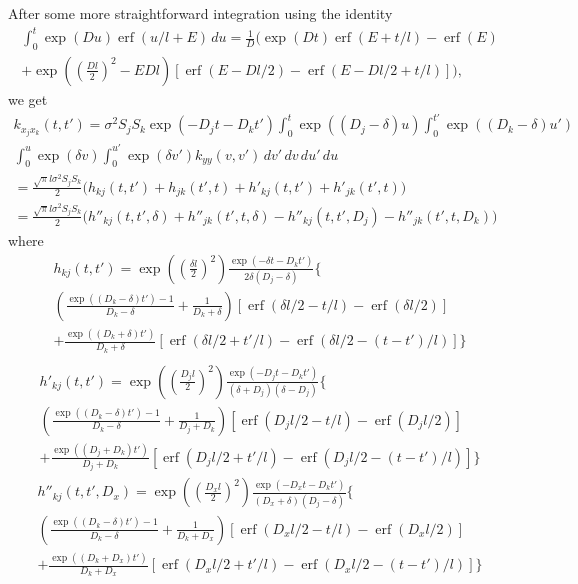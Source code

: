\documentclass{article}
\newcommand{\erf}{\operatorname{erf}}
\begin{document}
After some more straightforward integration using the identity
\begin{multline}
  \label{eq:gpsim_identity}
  \int_0^t \exp(D u) \erf(u/l + E)\,du =
  \frac{1}{D} \bigg(
  \exp(Dt) \erf(E + t/l) - \erf(E) \\
  + \exp\left(\left( \frac{Dl}{2}\right)^2 -E Dl \right)
  [ \erf(E - Dl/2) - \erf(E-Dl/2+t/l) ]
  \bigg),
\end{multline}
we get
\begin{multline}
  k_{x_j x_k}(t, t') = \sigma^2 S_j S_k \exp(-D_j t - D_k t')
  \int_0^t \exp((D_j - \delta) u)
  \int_0^{t'} \exp((D_k - \delta) u') \\
  \int_0^u \exp(\delta v) \int_0^{u'} \exp(\delta v') k_{yy}(v, v') \, dv'\, dv\, du'\, du \\
  = \frac{\sqrt{\pi} l \sigma^2 S_j S_k}{2} \bigg(
  h_{kj}(t, t') + h_{jk}(t', t) 
  +
  h'_{kj}(t, t') + h'_{jk}(t', t)
  \bigg) \\
  = \frac{\sqrt{\pi} l \sigma^2 S_j S_k}{2} \bigg(
  h''_{kj}(t, t', \delta) + h''_{jk}(t', t, \delta) 
  - h''_{kj}(t, t', D_j) - h''_{jk}(t', t, D_k)
  \bigg)
\end{multline}
where
\begin{multline}
  h_{kj}(t, t') = 
  \exp\left(\left(\frac{\delta l}{2}\right)^2\right)
  \frac{\exp(-\delta t - D_k t')}{2\delta (D_j - \delta)}
  \bigg\{ 
   \\
  \left(\frac{\exp((D_k-\delta) t') - 1}{D_k-\delta} +
    \frac{1}{D_k + \delta} \right)
  [\erf(\delta l/2 - t/l) - \erf(\delta l/2)]
  \\
  + \frac{\exp((D_k+\delta)t')}{D_k+\delta}
  [\erf(\delta l/2 + t'/l)
  - \erf(\delta l/2 - (t-t')/l)]
  \bigg\} \\
\end{multline}
\begin{multline}
  h'_{kj}(t, t') = 
  \exp\left(\left(\frac{D_j l}{2}\right)^2\right)
  \frac{\exp(-D_j t - D_k t')}{(\delta + D_j)(\delta - D_j)}
  \bigg\{
  \\
  \left(\frac{\exp((D_k - \delta) t') - 1}{D_k - \delta}
    + \frac{1}{D_j + D_k} \right)
  [\erf(D_j l/2 - t/l) - \erf(D_j l/2)]
  \\
  + \frac{\exp((D_j + D_k) t')}{D_j + D_k}
  [\erf(D_j l/2 + t'/l) - \erf(D_j l/2 - (t-t')/l)]
  \bigg\}
\end{multline}
\begin{multline}
  h''_{kj}(t, t', D_x) = 
  \exp\left(\left(\frac{D_x l}{2}\right)^2\right)
  \frac{\exp(-D_x t - D_k t')}{(D_x + \delta) (D_j - \delta)}
  \bigg\{ 
   \\
  \left(\frac{\exp((D_k-\delta) t') - 1}{D_k-\delta} +
    \frac{1}{D_k + D_x} \right)
  [\erf(D_x l/2 - t/l) - \erf(D_x l/2)]
  \\
  + \frac{\exp((D_k+D_x)t')}{D_k+D_x}
  [\erf(D_x l/2 + t'/l)
  - \erf(D_x l/2 - (t-t')/l)]
  \bigg\} \\
\end{multline}
\end{document}
